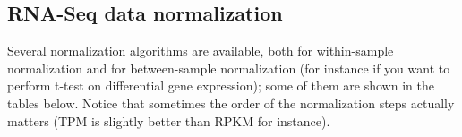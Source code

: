     \subsection{RNA-Seq data normalization}
      Several normalization algorithms are available, both for within-sample normalization and for between-sample normalization (for instance if you want to perform t-test on differential gene expression); some of them are shown in the tables below.
      Notice that sometimes the order of the normalization steps actually matters (TPM is slightly better than RPKM for instance).
